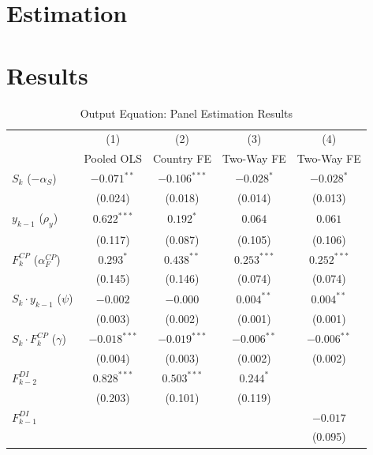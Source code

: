 \documentclass[12pt, a4paper]{article}
\begin{document}
\section{Estimation}
\label{sec:estimation}

\section{Results}
\label{sec:results}
\begin{table}[htbp]
\centering
\caption{Output Equation: Panel Estimation Results}
\label{tab:output_equation}
\small
\begin{tabular}{lcccc}
\toprule
 & (1) & (2) & (3) & (4) \\
 & Pooled OLS & Country FE & Two-Way FE & Two-Way FE \\
\midrule
$S_k$ ($-\alpha_S$)
  & $-0.071^{**}$  & $-0.106^{***}$ & $-0.028^{*}$   & $-0.028^{*}$   \\
  & (0.024)        & (0.018)        & (0.014)        & (0.013)        \\[4pt]
$y_{k-1}$ ($\rho_y$)
  & $0.622^{***}$  & $0.192^{*}$    & $0.064$        & $0.061$        \\
  & (0.117)        & (0.087)        & (0.105)        & (0.106)        \\[4pt]
$F^{CP}_k$ ($\alpha^{CP}_F$)
  & $0.293^{*}$    & $0.438^{**}$   & $0.253^{***}$  & $0.252^{***}$  \\
  & (0.145)        & (0.146)        & (0.074)        & (0.074)        \\[4pt]
$S_k \cdot y_{k-1}$ ($\psi$)
  & $-0.002$       & $-0.000$       & $0.004^{**}$   & $0.004^{**}$   \\
  & (0.003)        & (0.002)        & (0.001)        & (0.001)        \\[4pt]
$S_k \cdot F^{CP}_k$ ($\gamma$)
  & $-0.018^{***}$ & $-0.019^{***}$ & $-0.006^{**}$  & $-0.006^{**}$  \\
  & (0.004)        & (0.003)        & (0.002)        & (0.002)        \\[4pt]
$F^{DI}_{k-2}$
  & $0.828^{***}$  & $0.503^{***}$  & $0.244^{*}$    &                \\
  & (0.203)        & (0.101)        & (0.119)        &                \\[4pt]
$F^{DI}_{k-1}$
  &                &                &                & $-0.017$       \\
  &                &                &                & (0.095)        \\[4pt]

\end{tabular}
\end{table}
\end{document}
